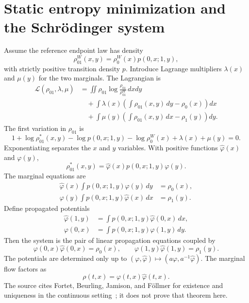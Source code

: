 \section{Static entropy minimization and the Schr\"odinger system}
Assume the reference endpoint law has density
\[
 \rho^W_{01}(x,y)=\rho^W_0(x)p(0,x;1,y),
\]
with strictly positive transition density $p$.  Introduce Lagrange multipliers $\lambda(x)$ and
$\mu(y)$ for the two marginals.  The Lagrangian is
\begin{align*}
 \mathcal L(\rho_{01},\lambda,\mu)
 &=\iint \rho_{01}\log\frac{\rho_{01}}{\rho^W_{01}}\,dxdy\\
 &\quad+\int\lambda(x)\left(\int\rho_{01}(x,y)\,dy-\rho_0(x)\right)dx\\
 &\quad+\int\mu(y)\left(\int\rho_{01}(x,y)\,dx-\rho_1(y)\right)dy.
\end{align*}
The first variation in $\rho_{01}$ is
\[
 1+\log\rho^*_{01}(x,y)-\log p(0,x;1,y)-\log\rho^W_0(x)
 +\lambda(x)+\mu(y)=0.
\]
Exponentiating separates the $x$ and $y$ variables.  With positive functions
$\widehat\varphi(x)$ and $\varphi(y)$,
\begin{equation}
 \rho^*_{01}(x,y)
 =\widehat\varphi(x)p(0,x;1,y)\varphi(y).
 \label{eq:CGP-optimaljoint}
\end{equation}
The marginal equations are
\begin{align}
 \widehat\varphi(x)\int p(0,x;1,y)\varphi(y)\,dy&=\rho_0(x),
 \label{eq:CGP-opt1}\\
 \varphi(y)\int p(0,x;1,y)\widehat\varphi(x)\,dx&=\rho_1(y).
 \label{eq:CGP-opt2}
\end{align}
Define propagated potentials
\begin{align*}
 \widehat\varphi(1,y)&=\int p(0,x;1,y)\widehat\varphi(0,x)\,dx,\\
 \varphi(0,x)&=\int p(0,x;1,y)\varphi(1,y)\,dy.
\end{align*}
Then the system is the pair of linear propagation equations coupled by
\begin{equation}
 \varphi(0,x)\widehat\varphi(0,x)=\rho_0(x),
 \qquad
 \varphi(1,y)\widehat\varphi(1,y)=\rho_1(y).
 \label{eq:CGP-boundary-products}
\end{equation}
The potentials are determined only up to
$(\varphi,\widehat\varphi)\mapsto(a\varphi,a^{-1}\widehat\varphi)$.
The marginal flow factors as
\[
 \rho(t,x)=\varphi(t,x)\widehat\varphi(t,x).
\]
The source cites Fortet, Beurling, Jamison, and F\"ollmer for existence and uniqueness in the
continuous setting~\cite{Fortet1940,Beurling1960,Jamison1974,Jamison1975,Follmer1988}; it does not
prove that theorem here.

